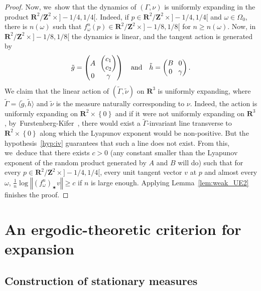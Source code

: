 \documentclass[11pt]{article}
\newcommand{\set}[1]{\left\{#1\right\}}
\newcommand{\norm}[1]{{\left\Vert#1\right\Vert}}
\newcommand{\unsur}[1]{\frac{1}{#1}}
\def\R{\mathbf{R}}
\def\Z{\mathbf{Z}}
\theoremstyle{plain}
\theoremstyle{definition}
\numberwithin{equation}{section}
\begin{document}
\begin{proof}
Now, we~show that the dynamics of $(\Gamma, \nu)$ is uniformly expanding in the product
$\R^2/\Z^2 \times{}]-1/4, 1/4[$. Indeed, if $p\in \R^2/\Z^2 \times{}]-1/4, 1/4[$ and $\omega\in \Omega_0$, there
is $n(\omega)$ such that $f^n_\omega(p)\in \R^2/\Z^2 \times{}]-1/8, 1/8[$ for $n\geq n(\omega)$.
Now, in $\R^2/\Z^2 \times{}]-1/8, 1/8[$ the dynamics is linear, and the tangent action is generated by
\begin{equation*}\arraycolsep3.5pt
\tilde g = \begin{pmatrix}A & \begin{pmatrix} c_1 \\ c_2 \end{pmatrix} \\ 0 & \gamma
\end{pmatrix}
\quad\text{and}\quad
\tilde h = \begin{pmatrix}B& 0 \\ 0 & \gamma
\end{pmatrix}.
\end{equation*}
We claim that the linear action of $(\tilde \Gamma, \tilde \nu)$ on $\R^3$ is uniformly expanding,
where $\tilde \Gamma = \langle{\tilde g, \tilde h}\rangle$ and $\tilde \nu$ is the measure naturally
corresponding to $\nu$. Indeed, the action is uniformly expanding on $\R^2\times \set{0}$ and
if it were not uniformly expanding on $\R^3$, by~Furstenberg-Kifer~\cite{furstenberg-kifer},
there would exist a $\tilde \Gamma$-invariant line transverse to $\R^2\times \set{0}$ along which the Lyapunov exponent would be non-positive. But the hypothesis~\eqref{hyp:iv} guarantees that such a line does not exist.
From this, we~deduce that there exists $c>0$ (any constant smaller than the Lyapunov exponent
of the random product generated by $A$ and $B$ will do)
such that
for every $p \in \R^2/\Z^2 \times{}]-1/4, 1/4[$, every unit tangent vector $v$ at $p$
and almost every $\omega$, $\unsur{n} \log \norm{(f_\omega^n)_\varstar v}\geq c$ if $n$ is large enough.
Applying Lemma~\ref{lem:weak_UE2} finishes the proof.
\end{proof}

\section{An ergodic-theoretic criterion for expansion}\label{sec:criterion}

\subsection{Construction of stationary measures}
\label{subs:stationary}
\end{document}
